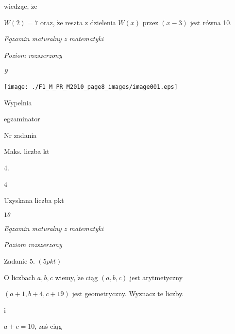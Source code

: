 \documentclass[a4paper,12pt]{article}
\begin{document}
wiedząc, $\dot{\mathrm{z}}\mathrm{e}$

$W(2)=7$ oraz, $\dot{\mathrm{z}}\mathrm{e}$ reszta z dzielenia $W(x)$ przez $(x-3)$ jest równa 10.





{\it Egzamin maturalny z matematyki}

{\it Poziom rozszerzony}

{\it 9}
\begin{center}
\texttt{[image: ./F1\_M\_PR\_M2010\_page8\_images/image001.eps]}
\end{center}
Wypelnia

egzaminator

Nr zadania

Maks. liczba kt

4.

4

Uzyskana liczba pkt





$ 1\theta$

{\it Egzamin maturalny z matematyki}

{\it Poziom rozszerzony}

Zadanie 5. $(5pkt)$

$\mathrm{O}$ liczbach $a, b, c$ wiemy, $\dot{\mathrm{z}}\mathrm{e}$ ciąg $(a,b,c)$ jest arytmetyczny

$(a+1,b+4,c+19)$ jest geometryczny. Wyznacz te liczby.

i

$a+c=10$, zaś ciąg
\end{document}
